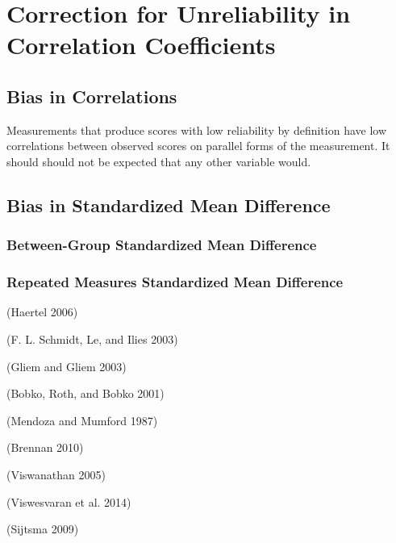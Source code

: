 \documentclass[
  letterpaper,
  DIV=11,
  numbers=noendperiod]{scrreprt}
\begin{document}
\hypertarget{correction-for-unreliability-in-correlation-coefficients}{%
\section{Correction for Unreliability in Correlation
Coefficients}\label{correction-for-unreliability-in-correlation-coefficients}}

\hypertarget{bias-in-correlations}{%
\subsection{Bias in Correlations}\label{bias-in-correlations}}

Measurements that produce scores with low reliability by definition have
low correlations between observed scores on parallel forms of the
measurement. It should should not be expected that any other variable
would.

\hypertarget{bias-in-standardized-mean-difference}{%
\subsection{Bias in Standardized Mean
Difference}\label{bias-in-standardized-mean-difference}}

\hypertarget{between-group-standardized-mean-difference}{%
\subsubsection{Between-Group Standardized Mean
Difference}\label{between-group-standardized-mean-difference}}

\hypertarget{repeated-measures-standardized-mean-difference}{%
\subsubsection{Repeated Measures Standardized Mean
Difference}\label{repeated-measures-standardized-mean-difference}}

(Haertel 2006)

(F. L. Schmidt, Le, and Ilies 2003)

(Gliem and Gliem 2003)

(Bobko, Roth, and Bobko 2001)

(Mendoza and Mumford 1987)

(Brennan 2010)

(Viswanathan 2005)

(Viswesvaran et al. 2014)

(Sijtsma 2009)
\end{document}
